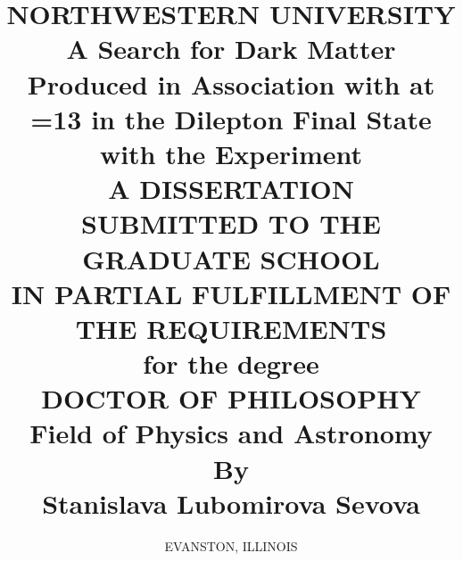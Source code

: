 \documentclass[hyperpdf,bindnopdf]{hepthesis}
\title{
  \normalsize
  \uppercase{Northwestern University} 
  \\
  \vspace{0.7 cm} 
  A Search for Dark Matter Produced in Association with \ttbar at \sqrtS=\unit{13}{\TeV} in the Dilepton Final State with the \CMS Experiment
  \\ 
  \vspace{0.7 cm}
  \uppercase{A Dissertation} \\
  \vspace{0.7 cm}
  \uppercase{Submitted to the graduate school \\ in partial fulfillment of the requirements} \\
  \vspace{0.7 cm}
  \small{for the degree} \\
  \vspace{0.7 cm}
  \uppercase{Doctor of Philosophy} \\
  \vspace{0.7 cm}
  Field of Physics and Astronomy \\
  \vspace{1.0 cm}
  By\\
  \vspace{0.3cm}
  Stanislava Lubomirova Sevova
}
\author{\normalsize \uppercase{Evanston, Illinois}}%
\begin{document}
\begin{frontmatter}
  
\end{frontmatter}

\begin{mainmatter}
  
  
  
  
  
  
  
\end{mainmatter}

\begin{appendices}
  
\end{appendices}

\begin{backmatter}
  
\end{backmatter}

\end{document}
